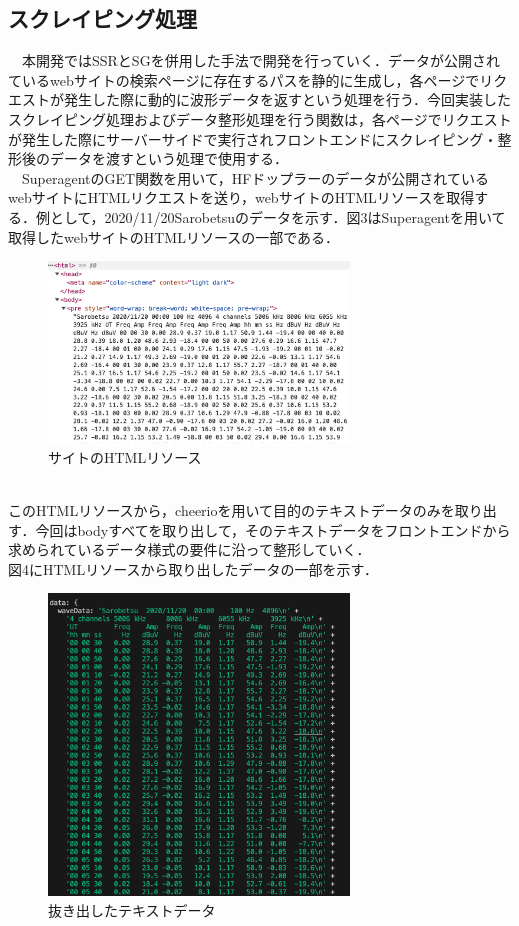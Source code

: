 \subsection{スクレイピング処理}
　本開発ではSSRとSGを併用した手法で開発を行っていく．データが公開されているwebサイトの検索ページに存在するパスを静的に生成し，各ページでリクエストが発生した際に動的に波形データを返すという処理を行う．今回実装したスクレイピング処理およびデータ整形処理を行う関数は，各ページでリクエストが発生した際にサーバーサイドで実行されフロントエンドにスクレイピング・整形後のデータを渡すという処理で使用する．\\
　SuperagentのGET関数を用いて，HFドップラーのデータが公開されているwebサイト\cite{hfd_link}にHTMLリクエストを送り，webサイトのHTMLリソースを取得する．例として，2020/11/20Sarobetsuのデータを示す．図3はSuperagentを用いて取得したwebサイトのHTMLリソースの一部である．\\
\begin{figure}[ht]
  \centering
  \includegraphics[width=80mm]{fig/htmlRes.png}
  \caption{サイトのHTMLリソース}
\end{figure}\\
このHTMLリソースから，cheerioを用いて目的のテキストデータのみを取り出す．今回はbodyすべてを取り出して，そのテキストデータをフロントエンドから求められているデータ様式の要件に沿って整形していく．\\
図4にHTMLリソースから取り出したデータの一部を示す．
\begin{figure}[ht]
   \centering
   \includegraphics[width=80mm]{fig/textData.png}
   \caption{抜き出したテキストデータ}
\end{figure}

